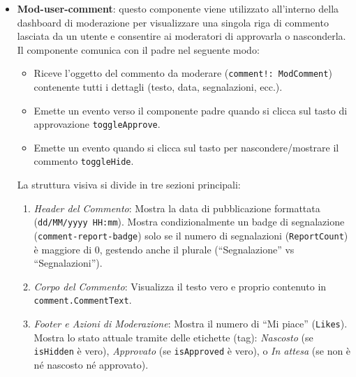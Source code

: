 \documentclass[11pt,a4paper]{article}
\begin{document}
\begin{itemize}
    Il template del componente, tramite espressioni valutate a runtime, applica selettivamente classi stilistiche condizionali sia sull'involucro esterno della card sia sui componenti interni di notifica: l'attributo \texttt{[class.is-closed]} modifica l'opacità e l'interattività dell'intera card se la stanza è disattivata (\texttt{disc.ForceClosed}), mentre l'elemento \texttt{span} muta dinamicamente le proprie proprietà cromatiche (es. verde per lo stato attivo, rosso per quello chiuso), massimizzando l'efficienza visiva dell'interfaccia utente durante le lunghe sessioni di auditing da parte del team di moderazione.
    \item \textbf{Mod-user-comment}: questo componente viene utilizzato all'interno della dashboard di moderazione per visualizzare una singola riga di commento lasciata da un utente e consentire ai moderatori di approvarla o nasconderla. Il componente comunica con il padre nel seguente modo:   
    \begin{itemize}
        \item Riceve l'oggetto del commento da moderare (\texttt{comment!: ModComment}) contenente tutti i dettagli (testo, data, segnalazioni, ecc.).
        \item Emette un evento verso il componente padre quando si clicca sul tasto di approvazione \texttt{toggleApprove}.
        \item Emette un evento quando si clicca sul tasto per nascondere/mostrare il commento \texttt{toggleHide}.
    \end{itemize}
    La struttura visiva si divide in tre sezioni principali:
    \begin{enumerate}
        \item \textit{Header del Commento}: Mostra la data di pubblicazione formattata (\texttt{dd/MM/yyyy HH:mm}). Mostra condizionalmente un badge di segnalazione (\texttt{comment-report-badge}) solo se il numero di segnalazioni (\texttt{ReportCount}) è maggiore di 0, gestendo anche il plurale (``Segnalazione'' vs ``Segnalazioni'').
        \item \textit{Corpo del Commento}: Visualizza il testo vero e proprio contenuto in \texttt{comment.CommentText}.
        \item \textit{Footer e Azioni di Moderazione}: Mostra il numero di ``Mi piace'' (\texttt{Likes}). Mostra lo stato attuale tramite delle etichette (tag): \textit{Nascosto} (se \texttt{isHidden} è vero), \textit{Approvato} (se \texttt{isApproved} è vero), o \textit{In attesa} (se non è né nascosto né approvato).
        

\end{enumerate}
\end{itemize}
\end{document}
